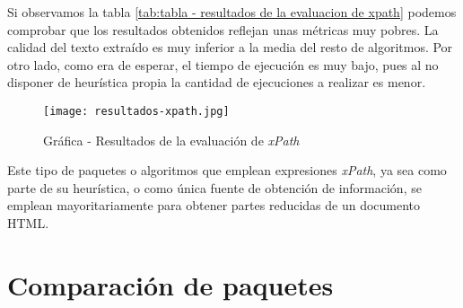 Si observamos la tabla \ref{tab:tabla - resultados de la evaluacion de xpath} podemos comprobar que los
resultados obtenidos reflejan unas métricas muy pobres. La calidad del texto extraído es muy inferior a la
media del resto de algoritmos. Por otro lado, como era de esperar, el tiempo de ejecución es muy bajo, pues
al no disponer de heurística propia la cantidad de ejecuciones a realizar es menor.

\begin{figure}[tphb]
    \centering
    \texttt{[image: resultados-xpath.jpg]}
    \caption{Gráfica - Resultados de la evaluación de \emph{xPath}}
    \label{img:grafica - resultados de la evaluacion de xpath}
\end{figure}

Este tipo de paquetes o algoritmos que emplean expresiones \emph{xPath}, ya sea como parte de su heurística,
o como única fuente de obtención de información, se emplean mayoritariamente para obtener partes reducidas
de un documento HTML.

\section{Comparación de paquetes}
\label{sec:comparacion de paquetes}
